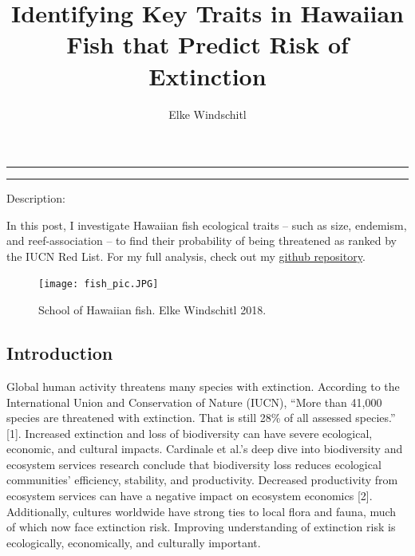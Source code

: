 \documentclass[
  letterpaper,
  DIV=11,
  numbers=noendperiod]{scrartcl}
\title{Identifying Key Traits in Hawaiian Fish that Predict Risk of
Extinction}
\author{Elke Windschitl}
\date{}
\begin{document}
\maketitle
\ifdefined\Shaded\renewenvironment{Shaded}{\begin{tcolorbox}[frame hidden, interior hidden, boxrule=0pt, borderline west={3pt}{0pt}{shadecolor}, enhanced, sharp corners, breakable]}{\end{tcolorbox}}\fi

\begin{center}\rule{0.5\linewidth}{0.5pt}\end{center}

\begin{center}\rule{0.5\linewidth}{0.5pt}\end{center}

Description:

In this post, I investigate Hawaiian fish ecological traits -- such as
size, endemism, and reef-association -- to find their probability of
being threatened as ranked by the IUCN Red List. For my full analysis,
check out my
\href{https://github.com/elkewind/eds-222-final-project}{github
repository}.

\begin{figure}

{\centering \texttt{[image: fish\_pic.JPG]}

}

\caption{School of Hawaiian fish. Elke Windschitl 2018.}

\end{figure}

\hypertarget{introduction}{%
\subsection{Introduction}\label{introduction}}

Global human activity threatens many species with extinction. According
to the International Union and Conservation of Nature (IUCN), ``More
than 41,000 species are threatened with extinction. That is still 28\%
of all assessed species.'' {[}1{]}. Increased extinction and loss of
biodiversity can have severe ecological, economic, and cultural impacts.
Cardinale et al.'s deep dive into biodiversity and ecosystem services
research conclude that biodiversity loss reduces ecological communities'
efficiency, stability, and productivity. Decreased productivity from
ecosystem services can have a negative impact on ecosystem economics
{[}2{]}. Additionally, cultures worldwide have strong ties to local
flora and fauna, much of which now face extinction risk. Improving
understanding of extinction risk is ecologically, economically, and
culturally important.
\end{document}
